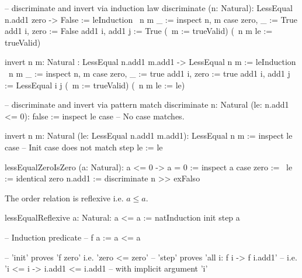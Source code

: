 \begin{alba}
    -- discriminate and invert via induction law
    discriminate (n: Natural): LessEqual n.add1 zero -> False :=
        leInduction
            {\ {n m} _ :=
                inspect n, m case
                    zero, _ :=
                        True
                    add1 i, zero :=
                        False
                    add1 i, add1 j :=
                        True}
            (\ {m} := trueValid)
            (\ {n m} le := trueValid)


    invert {n m: Natural}
        : LessEqual n.add1 m.add1 -> LessEqual n m
    :=
        leInduction
            {\ {n m} _ :=
                inspect n, m case
                    zero, _ :=
                        true
                    add1 i, zero :=
                        true
                    add1 i, add1 j :=
                        LessEqual i j}
            (\ {m} := trueValid)
            (\ {n m} le := le)


    -- discriminate and invert via pattern match
    discriminate {n: Natural} (le: n.add1 <= 0): false :=
        inspect le case
            -- No case matches.

    invert {n m: Natural} (le: LessEqual n.add1 m.add1): LessEqual n m
    :=
        inspect le case
            -- Init case does not match
            step le := le
\end{alba}



\begin{alba}
    lessEqualZeroIsZero (a: Natural): a <= 0 -> a = 0 :=
        inspect a case
            zero :=
                \ le := identical zero
            n.add1 :=
                discriminate {n} >> exFalso
\end{alba}





\noindent The order relation is reflexive i.e. $a \le a$.

\begin{alba}
    lessEqualReflexive {a: Natural}: a <= a :=
        natInduction init step a

    -- Induction predicate
    -- f a := a <= a

    -- 'init' proves 'f zero' i.e. 'zero <= zero'
    -- 'step' proves 'all i: f i -> f i.add1'
    --     i.e. 'i <= i -> i.add1 <= i.add1
    --     with implicit argument 'i'
\end{alba}



